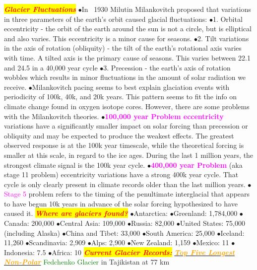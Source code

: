 \documentclass{article}
\newcommand{\ddd}{$\bullet$}
\newcommand{\red}[1]{\textcolor{red}{#1}}
\newcommand{\green}[1]{\textcolor{green}{#1}}
\newcommand{\pink}[1]{\textcolor{magenta}{#1}}
\newcommand{\orange}[1]{\textcolor{orange}{#1}}
\newcommand{\mysection}[1]{\colorbox{yellow}{\textbf{\textit{\red{#1}}}}}
\newcommand{\mysub}[1]{\underline{\textbf{{\textit{\orange{#1}}}}}}
\newcommand{\mysubsub}[1]{{{\green{#1}}}}
\newcommand{\vocab}[1]{{\pink{#1}}}
\begin{document}
\begin{multicols*}{4}
     \mysection{Glacier Fluctuations}
	        \ddd In ~1930 Milutin Milankovitch proposed that variations in three parameters of the earth's orbit caused glacial fluctuations: 
	        \ddd 1.	Orbital eccentricity - the orbit of the earth around the sun is not a circle, but is elliptical and also varies. This eccentricity is a minor cause for seasons.
	        \ddd 2.	Tilt variations in the axis of rotation (obliquity) - the tilt of the earth's rotational axis varies with time. A tilted axis is the primary cause of seasons. This varies between 22.1 and 24.5 in a 40,000 year cycle
	        \ddd 3.	Precession - the earth's axis of rotation wobbles which results in minor fluctuations in the amount of solar radiation we receive.
	        \ddd Milankovitch pacing seems to best explain glaciation events with periodicity of 100k, 40k, and 20k years. This pattern seems to fit the info on climate change found in oxygen isotope cores. However, there are some problems with the Milankovitch theories.
	        \ddd \vocab{\textbf{100,000 year Problem eccentricity}} variations have a significantly smaller impact on solar forcing than precession or obliquity and may be expected to produce the weakest effects. The greatest observed response is at the 100k year timescale, while the theoretical forcing is smaller at this scale, in regard to the ice ages. During the last 1 million years, the strongest climate signal is the 100k year cycle.
	        \ddd \vocab{\textbf{400,000 year Problem}} (aka stage 11 problem) eccentricity variations have a strong 400k year cycle. That cycle is only clearly present in climate records older than the last million years.
	        \ddd \vocab{Stage 5} problem refers to the timing of the penultimate interglacial that appears to have begun 10k years in advance of the solar forcing hypothesized to have caused it.
        \mysection{Where are glaciers found?}
            \ddd Antarctica:	\pink{ }
            \ddd Greenland:	1,784,000
            \ddd Canada: 200,000
            \ddd Central Asia:	109,000
            \ddd Russia:	82,000
            \ddd United States:	75,000 (including Alaska)
            \ddd China and Tibet:	33,000
            \ddd South America: 25,000
            \ddd Iceland:	11,260
            \ddd Scandinavia:	2,909
            \ddd Alps: 2,900
            \ddd New Zealand:	1,159
            \ddd Mexico: 11
            \ddd Indonesia:	7.5
            \ddd Africa: 10
		\mysection{Current Glacier Records:} 
		    \mysub{Top Five Longest Non-Polar}
		    \mysubsub {Fedchenko Glacier} in Tajikistan at 77 km

\end{multicols*}
\end{document}

